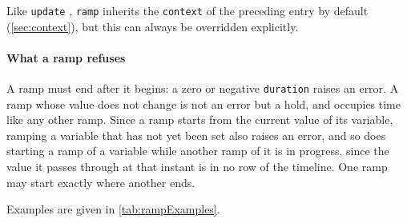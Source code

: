 \documentclass{SciPost}
\newcommand{\python}[1]{%
  \texttt{#1}%
}
\newenvironment{pythonTable}
  {\VerbatimEnvironment
   \begin{minipage}[t]{\linewidth}%
   \begin{verbatim}}
  {\end{verbatim}%
   \end{minipage}}
\begin{document}
Like \python{update}, \python{ramp} inherits the \python{context} of the preceding entry by default (\cref{sec:context}), but this can always be overridden explicitly.
 
\paragraph{What a ramp refuses} A ramp must end after it begins: a zero or negative \python{duration} raises an error. A ramp whose value does not change is not an error but a hold, and occupies time like any other ramp. Since a ramp starts from the current value of its variable, ramping a variable that has not yet been set also raises an error, and so does starting a ramp of a variable while another ramp of it is in progress, since the value it passes through at that instant is in no row of the timeline. One ramp may start exactly where another ends.
 
Examples are given in \cref{tab:rampExamples}.
 
\begin{table}
\caption{\label{tab:rampExamples} Examples of \python{ramp} usage. In each case the starting time is left to the \python{origin} mechanism, the ramp starts from the value its variable has at that instant, and the end value is the value the variable is ramped to.}
\end{table}
 
\end{document}
